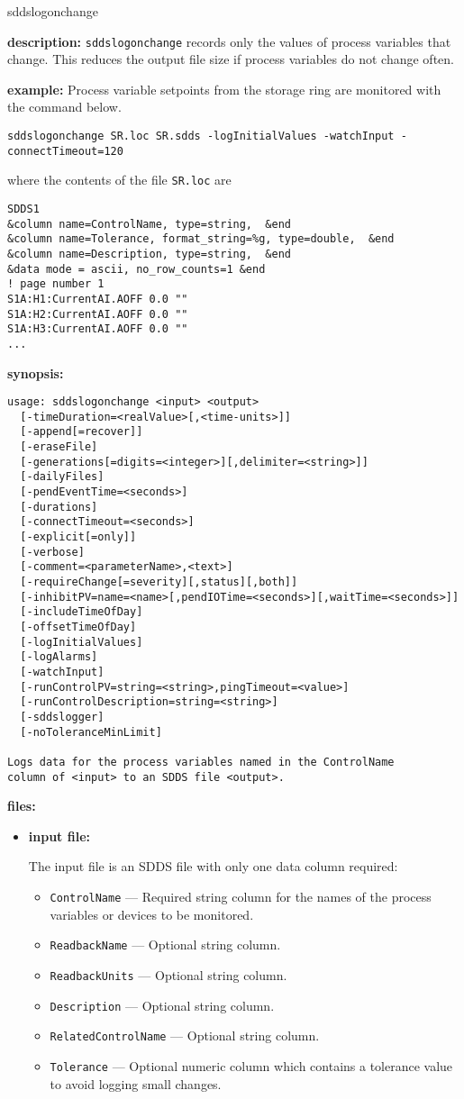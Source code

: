 \begin{sddsprog}{sddslogonchange}
\item {\bf description:}
\verb+sddslogonchange+ records only the values of process variables that change. This reduces the output file size if process variables do not change often.
\item {\bf example:} 
% 
Process variable setpoints from the storage ring are monitored
with the command below.
\begin{verbatim}
sddslogonchange SR.loc SR.sdds -logInitialValues -watchInput -connectTimeout=120
\end{verbatim}
where the contents of the file \verb+SR.loc+ are
\begin{verbatim}
SDDS1
&column name=ControlName, type=string,  &end
&column name=Tolerance, format_string=%g, type=double,  &end
&column name=Description, type=string,  &end
&data mode = ascii, no_row_counts=1 &end
! page number 1
S1A:H1:CurrentAI.AOFF 0.0 ""
S1A:H2:CurrentAI.AOFF 0.0 ""
S1A:H3:CurrentAI.AOFF 0.0 ""
...
\end{verbatim}
\item {\bf synopsis:} 
\begin{verbatim}
usage: sddslogonchange <input> <output> 
  [-timeDuration=<realValue>[,<time-units>]]
  [-append[=recover]] 
  [-eraseFile]
  [-generations[=digits=<integer>][,delimiter=<string>]]
  [-dailyFiles]
  [-pendEventTime=<seconds>] 
  [-durations] 
  [-connectTimeout=<seconds>]
  [-explicit[=only]] 
  [-verbose] 
  [-comment=<parameterName>,<text>]
  [-requireChange[=severity][,status][,both]]
  [-inhibitPV=name=<name>[,pendIOTime=<seconds>][,waitTime=<seconds>]]
  [-includeTimeOfDay] 
  [-offsetTimeOfDay]
  [-logInitialValues]
  [-logAlarms]
  [-watchInput]
  [-runControlPV=string=<string>,pingTimeout=<value>]
  [-runControlDescription=string=<string>]
  [-sddslogger]
  [-noToleranceMinLimit]

Logs data for the process variables named in the ControlName
column of <input> to an SDDS file <output>.
\end{verbatim}
\item {\bf files:}
\begin{itemize}
\item {\bf input file:}\par
The input file is an SDDS file with only one data column required:
\begin{itemize}
        \item {\tt ControlName} --- Required string column for the names of the process variables or devices to be monitored.
        \item {\tt ReadbackName} --- Optional string column.
        \item {\tt ReadbackUnits} --- Optional string column.
        \item {\tt Description} --- Optional string column.
        \item {\tt RelatedControlName} --- Optional string column.
        \item {\tt Tolerance} --- Optional numeric column which contains a tolerance value to avoid logging small changes.
\end{itemize}


\end{itemize}
\end{sddsprog}
